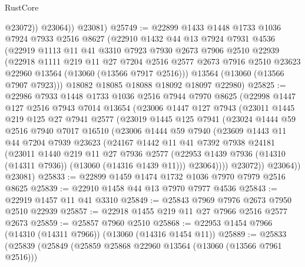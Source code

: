 \begin{lexlean}{RustCore}
\begin{coremodule}
              @23072))
          @23064))
      @23081)
@25749 := @22899
    @1433
    @1448
    @1733
    @1036
    @7924
    @7933
    @2516
    @8627
    (@22910
      @1432
      @44
      @13
      @7924
      @7931
      @4536
      (@22919
        @1113
        @11
        @41
        @3310
        @7923
        @7930
        @2673
        @7906
        @2510
        @22939
        (@22918
          @1111
          @219
          @11
          @27
          @7204
          @2516
          @2577
          @2673
          @7916
          @2510
          @23623
          @22960
          @13564
          (@13060 (@13566 @7917 @2516)))
        @13564
        (@13060 (@13566 @7907 @7923)))
      @18082
      @18085
      @18088
      @18092
      @18097
      @22980)
@25825 := @22986
    @7933
    @1448
    @1733
    @1036
    @2516
    @7944
    @7970
    @8625
    (@22998
      @1447
      @127
      @2516
      @7943
      @7014
      @13654
      (@23006
        @1447
        @127
        @7943
        (@23011
          @1445
          @219
          @125
          @27
          @7941
          @2577
          (@23019
            @1445
            @125
            @7941
            (@23024
              @1444
              @59
              @2516
              @7940
              @7017
              @16510
              (@23006
                @1444
                @59
                @7940
                (@23609
                  @1443
                  @11
                  @44
                  @7204
                  @7939
                  @23623
                  (@24167
                    @1442
                    @11
                    @41
                    @7392
                    @7938
                    @24181
                    (@23011
                      @1440
                      @219
                      @11
                      @27
                      @7936
                      @2577
                      (@22953 @1439 @7936 (@14310 (@14311 @7936)) (@13060 (@14316 @1439 @11)))
                      @23064))))
              @23072))
          @23064))
      @23081)
@25833 := @22899 @1459 @1474 @1732 @1036 @7970 @7979 @2516 @8625
@25839 := @22910 @1458 @44 @13 @7970 @7977 @4536
@25843 := @22919 @1457 @11 @41 @3310
@25849 := @25843 @7969 @7976 @2673 @7950 @2510 @22939
@25857 := @22918 @1455 @219 @11 @27 @7966 @2516 @2577 @2673
@25859 := @25857 @7960 @2510
@25868 := @22953 @1454 @7966 (@14310 (@14311 @7966)) (@13060 (@14316 @1454 @11))
@25889 := @25833
    (@25839
      (@25849
        (@25859 @25868 @22960 @13564 (@13060 (@13566 @7961 @2516)))

\end{coremodule}
\end{lexlean}
